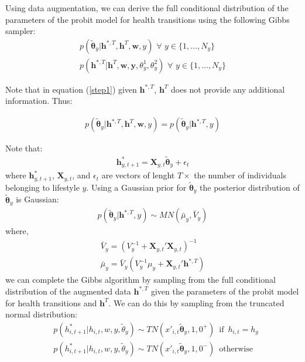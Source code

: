 \documentclass{article}
\begin{document}
Using data augmentation, we can derive the full conditional distribution of the parameters of the probit model for health transitions using the following Gibbs sampler:
\begin{align}
    p(\tilde{\bm{\theta}}_y|\bm{h}^{*,T},\bm{h}^T,\bm{w},y) \,\, \forall \,\, y\in \lbrace 1,\dots,N_y\rbrace \label{step1} \\
    p(\bm{h}^{*,T}|\bm{h}^T,\bm{w},\bm{y},\theta^1_y,\theta^2_y) \,\, \forall \,\,  y\in \lbrace 1,\dots,N_y\rbrace \label{step2}
\end{align}

Note that in equation (\ref{step1}) given $\bm{h}^{*,T}$, $\bm{h}^T$ does not provide any additional information. Thus:

\begin{align*}
    p(\tilde{\bm{\theta}}_y|\bm{h}^{*,T},\bm{h}^T,\bm{w},y) = p(\tilde{\bm{\theta}}_y|\bm{h}^{*,T},y)
\end{align*}

Note that:
\begin{align*}
    \bm{h}^*_{y,t+1}=\bm{X}_{y,t}\tilde{\bm{\theta}}_y+\epsilon_{t}	
\end{align*}
where $\bm{h}^*_{y,t+1}$, $\bm{X}_{y,t}$, and $\epsilon_{t}$ are vectors of lenght $T \times$ the number of individuals belonging to lifestyle $y$. Using a Gaussian prior for $\tilde{\bm{\theta}}_y$ the posterior distribution of $\tilde{\bm{\theta}}_y$ is Gaussian:
\begin{align*}
    p(\tilde{\bm{\theta}}_y|\bm{h}^{*,T},y) \sim MN(\bar{\mu}_{y},\bar{V}_{y}) 
\end{align*}
where,
\begin{align*}
    \bar{V}_{y}=(V_y^{-1}+\bm{X}_{y,t}'\bm{X}_{y,t})^{-1} \\
    \bar{\mu}_{y}=\bar{V}_{y}(V_y^{-1}\mu_y+\bm{X}_{y,t}'\bm{h}^{*,T})
\end{align*}
we can complete the Gibbs algorithm by sampling from the full conditional distribution of the augmented data $\bm{h}^{*,T}$ given the parameters of the probit model for health transitions and $\bm{h}^T$.
We can do this by sampling from the truncated normal distribution:
\begin{align*}
    &p(h_{i,t+1}^{*}|h_{i,t},w,y,\tilde{\theta}_y) \sim TN(x'_{i,t}\tilde{\bm{\theta}}_y,1,0^+) \,\,\, \text{if} \,\,\, h_{i,t}=h_g\\
    &p(h_{i,t+1}^{*}|h_{i,t},w,y,\tilde{\theta}_y) \sim TN(x'_{i,t}\tilde{\bm{\theta}}_y,1,0^-) \,\,\,\text{otherwise}
\end{align*}
\end{document}
